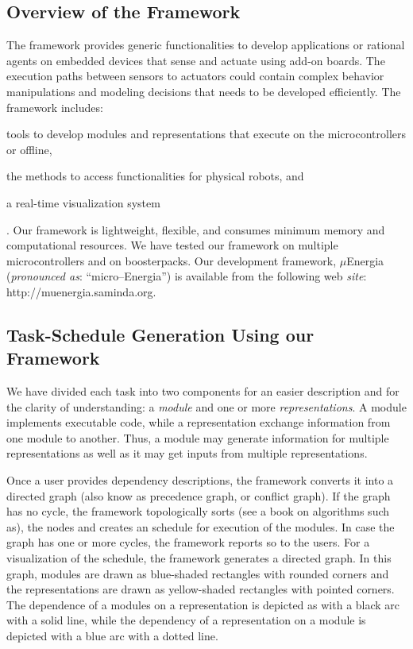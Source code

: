 \documentclass[]{IEEEtran}
\begin{document}
\subsection{Overview of the Framework}
\label{sec:OverviewOfTheFramework}

\par
The framework provides generic functionalities to develop applications or rational agents 
on embedded devices that sense and actuate using add-on boards. The execution paths between sensors 
to actuators could contain complex behavior manipulations and modeling decisions that needs to be 
developed efficiently.
The framework 
includes: \begin{inparaenum}[($i$)] \item tools to develop modules and representations that execute on 
the microcontrollers or offline, \item the methods to access functionalities for physical 
robots, 
and \item a real-time visualization system\end{inparaenum}. Our framework is lightweight, flexible, 
and consumes minimum memory and computational resources. We have tested our framework on multiple 
microcontrollers and on boosterpacks. 
Our development framework, $\mu$Energia (\textit{pronounced as}: ``micro--Energia'') is available from the following web 
\textit{site}:
{http://muenergia.saminda.org}.

\subsection{Task-Schedule Generation Using our Framework}
\label{FrameWorkDescription}


We have divided each task into two components for an easier description and for the clarity of understanding: a {\em module} and one or more {\em representations}. A module implements executable code, while a representation exchange information from one module to another. Thus, a module may generate information for multiple representations as well as it may get inputs from multiple representations. 
\par
Once a user provides dependency descriptions, the framework converts it  into a directed graph (also know as precedence graph, or conflict graph).  If the graph has no cycle, the framework topologically sorts (see a book on algorithms such as\cite{Cormen:AlgorithmBook}), the nodes and creates an schedule for execution of the modules. In case the graph has one or more cycles, the framework reports so to the users.
For a visualization of the schedule, the framework  generates a directed graph. In this graph, modules are drawn as blue-shaded rectangles with rounded corners and the representations are drawn as yellow-shaded rectangles with pointed corners. The dependence of a modules on a representation is depicted as with a black arc with a solid line, while the dependency of a representation on a module is depicted with a blue arc with a dotted line. 
\end{document}
